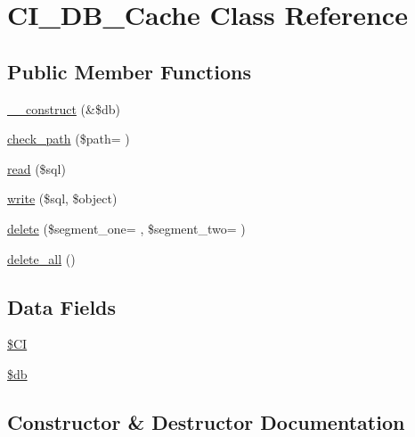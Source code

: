 \hypertarget{class_c_i___d_b___cache}{}\section{C\+I\+\_\+\+D\+B\+\_\+\+Cache Class Reference}
\label{class_c_i___d_b___cache}
\subsection*{Public Member Functions}
\begin{DoxyCompactItemize}
\item 
\hyperlink{class_c_i___d_b___cache_aaf2ef772755ec6f361d44e16cc9ffd69}{\+\_\+\+\_\+construct} (\&\$db)
\item 
\hyperlink{class_c_i___d_b___cache_abfc83fa929a7465bb8cf3d6945b4c6a1}{check\+\_\+path} (\$path= \textquotesingle{}\textquotesingle{})
\item 
\hyperlink{class_c_i___d_b___cache_a6e421e93555105d187d7e6ba4c84521b}{read} (\$sql)
\item 
\hyperlink{class_c_i___d_b___cache_a483ea50183465928c931aa17b4f4b5b8}{write} (\$sql, \$object)
\item 
\hyperlink{class_c_i___d_b___cache_a309c0e75720989c8d45fa47bbf05b5a9}{delete} (\$segment\+\_\+one= \textquotesingle{}\textquotesingle{}, \$segment\+\_\+two= \textquotesingle{}\textquotesingle{})
\item 
\hyperlink{class_c_i___d_b___cache_ac83c8ea1573fe325dfd87a282627fe6d}{delete\+\_\+all} ()
\end{DoxyCompactItemize}
\subsection*{Data Fields}
\begin{DoxyCompactItemize}
\item 
\hyperlink{class_c_i___d_b___cache_ae0314d046ddf7fcfaec03222977427d3}{\$\+C\+I}
\item 
\hyperlink{class_c_i___d_b___cache_a1fa3127fc82f96b1436d871ef02be319}{\$db}
\end{DoxyCompactItemize}


\subsection{Constructor \& Destructor Documentation}
\hypertarget{class_c_i___d_b___cache_aaf2ef772755ec6f361d44e16cc9ffd69}{}
